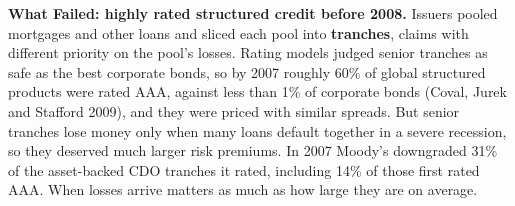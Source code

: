 \begin{callout}
\textbf{What Failed: highly rated structured credit before 2008.} Issuers pooled mortgages and other loans and sliced each pool into \textbf{tranches}, claims with different priority on the pool's losses. Rating models judged senior tranches as safe as the best corporate bonds, so by 2007 roughly 60\% of global structured products were rated AAA, against less than 1\% of corporate bonds (Coval, Jurek and Stafford 2009), and they were priced with similar spreads. But senior tranches lose money only when many loans default together in a severe recession, so they deserved much larger risk premiums. In 2007 Moody's downgraded 31\% of the asset-backed CDO tranches it rated, including 14\% of those first rated AAA. When losses arrive matters as much as how large they are on average.
\end{callout}
